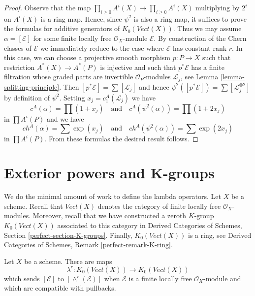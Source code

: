 \begin{proof}
Observe that the map $\prod_{i \geq 0} A^i(X) \to \prod_{i \geq 0} A^i(X)$
multiplying by $2^i$ on $A^i(X)$ is a ring map. Hence, since $\psi^2$
is also a ring map, it suffices to prove the formulas for additive generators
of $K_0(\textit{Vect}(X))$. Thus we may assume $\alpha = [\mathcal{E}]$
for some finite locally free $\mathcal{O}_X$-module $\mathcal{E}$.
By construction of the Chern classes of $\mathcal{E}$ we immediately
reduce to the case where $\mathcal{E}$ has constant rank $r$.
In this case, we can choose a projective smooth morphism $p : P \to X$
such that restriction $A^*(X) \to A^*(P)$ is injective
and such that $p^*\mathcal{E}$ has a finite filtration whose
graded parts are invertible $\mathcal{O}_P$-modules $\mathcal{L}_j$, see
Lemma \ref{lemma-splitting-principle}. Then
$[p^*\mathcal{E}] = \sum [\mathcal{L}_j]$ and hence
$\psi^2([p^*\mathcal{E}]) = \sum [\mathcal{L}_j^{\otimes 2}]$
by definition of $\psi^2$. Setting $x_j  = c^A_1(\mathcal{L}_j)$
we have
$$
c^A(\alpha) = \prod (1 + x_j)
\quad\text{and}\quad
c^A(\psi^2(\alpha)) = \prod (1 + 2 x_j)
$$
in $\prod A^i(P)$ and we have
$$
ch^A(\alpha) = \sum \exp(x_j)
\quad\text{and}\quad
ch^A(\psi^2(\alpha)) = \sum \exp(2 x_j)
$$
in $\prod A^i(P)$. From these formulas the desired result follows.
\end{proof}







\section{Exterior powers and K-groups}
\label{section-lambda-operations}

\noindent
We do the minimal amount of work to define the lambda operators.
Let $X$ be a scheme. Recall that $\textit{Vect}(X)$ denotes the
category of finite locally free $\mathcal{O}_X$-modules.
Moreover, recall that we have constructed a zeroth $K$-group
$K_0(\textit{Vect}(X))$ associated to this category in
Derived Categories of Schemes, Section \ref{perfect-section-K-groups}.
Finally, $K_0(\textit{Vect}(X))$ is a ring, see
Derived Categories of Schemes, Remark \ref{perfect-remark-K-ring}.

\begin{lemma}
\label{lemma-lambda-operations}
Let $X$ be a scheme. There are maps
$$
\lambda^r : K_0(\textit{Vect}(X)) \longrightarrow K_0(\textit{Vect}(X))
$$
which sends $[\mathcal{E}]$ to $[\wedge^r(\mathcal{E})]$
when $\mathcal{E}$ is a finite locally free $\mathcal{O}_X$-module
and which are compatible with pullbacks.
\end{lemma}

